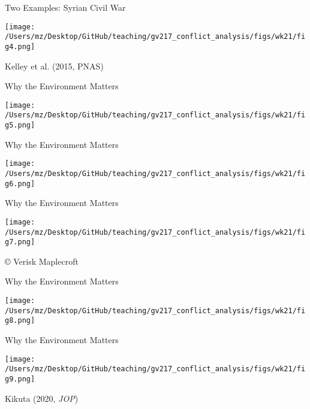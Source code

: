 \documentclass[handout]{beamer}
\begin{document}
\begin{frame}{Two Examples: Syrian Civil War}
    \pause
    \begin{center}
        \texttt{[image: /Users/mz/Desktop/GitHub/teaching/gv217\_conflict\_analysis/figs/wk21/fig4.png]}
    \end{center}
    \tiny Kelley et al. (2015, PNAS) 
\end{frame}

\begin{frame}{Why the Environment Matters}
    \pause
    \begin{center}
        \texttt{[image: /Users/mz/Desktop/GitHub/teaching/gv217\_conflict\_analysis/figs/wk21/fig5.png]}
    \end{center}
\end{frame}

\begin{frame}{Why the Environment Matters}
    \pause
    \begin{center}
        \texttt{[image: /Users/mz/Desktop/GitHub/teaching/gv217\_conflict\_analysis/figs/wk21/fig6.png]}
    \end{center}
\end{frame}

\begin{frame}{Why the Environment Matters}
    \pause
    \begin{center}
        \texttt{[image: /Users/mz/Desktop/GitHub/teaching/gv217\_conflict\_analysis/figs/wk21/fig7.png]}
    \end{center}
    \tiny © Verisk Maplecroft
\end{frame}

\begin{frame}{Why the Environment Matters}
    \pause
    \begin{center}
        \texttt{[image: /Users/mz/Desktop/GitHub/teaching/gv217\_conflict\_analysis/figs/wk21/fig8.png]}
    \end{center}
\end{frame}

\begin{frame}{Why the Environment Matters}
    \pause
    \begin{center}
        \texttt{[image: /Users/mz/Desktop/GitHub/teaching/gv217\_conflict\_analysis/figs/wk21/fig9.png]}
    \end{center}
    \tiny Kikuta (2020, \emph{JOP})
\end{frame}
\end{document}
